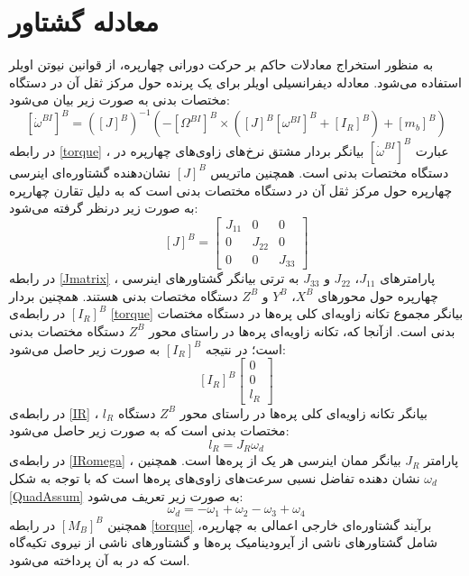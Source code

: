\section{معادله گشتاور}
به منظور استخراج معادلات حاکم بر حرکت دورانی چهارپره، از قوانین نیوتن اویلر استفاده می‌شود. 
معادله دیفرانسیلی اویلر برای یک پرنده حول مرکز ثقل آن در دستگاه مختصات بدنی به صورت زیر بیان می‌شود\cite{zipfel2000modeling}:
\begin{equation}\label{torque}
	\left[\dot\omega^{BI}\right]^B = \left(\left[J\right]^B\right)^{-1}
	\left(-\left[\Omega^{BI}\right]^B\times\left(
	\left[J\right]^B\left[\omega^{BI}\right]^B+
	\left[I_R\right]^B
	\right)+ \left[m_b\right]^B\right)
\end{equation}
در رابطه
\ref{torque}
، عبارت 
$\left[\dot\omega^{BI}\right]^B$
بیانگر بردار مشتق نرخ‌های زاوی‌های چهارپره در دستگاه مختصات بدنی است. همچنین ماتریس 
$\left[J\right]^B$
نشان‌دهنده گشتاوره‌ای اینرسی چهارپره حول مرکز ثقل آن در دستگاه مختصات بدنی است که به دلیل تقارن چهارپره به صورت زیر درنظر گرفته
 می‌شود:
 \begin{equation}\label{Jmatrix}
 	\left[J\right]^B = \begin{bmatrix}
 		J_{11} & 0 &0\\
 		0 & J_{22} & 0\\
 		0 & 0 & J_{33}
 	\end{bmatrix}
 \end{equation}
در رابطه 
\ref{Jmatrix}
، پارامترهای 
$J_{11}$،
$J_{22}$
و 
$J_{33}$
به ترتی بیانگر گشتاور‌های اینرسی چهارپره حول محورهای 
$X^B$،
$Y^B$
و 
$Z^B$
دستگاه مختصات بدنی هستند. همچنین بردار 
$\left[I_R\right]^B$
در رابطه‌ی 
\ref{torque}
بیانگر مجموع تكانه زاویه‌ای کلی پره‌ها در دستگاه مختصات بدنی است. ازآنجا که، تكانه زاویه‌ای پره‌ها در راستای محور
$Z^B$
دستگاه مختصات بدنی است؛ در نتیجه 
$\left[I_R\right]^B$
به صورت زیر حاصل می‌شود:
\begin{equation}\label{IR}
	\left[I_R\right]^B
	\begin{bmatrix}
		0\\0\\l_R
	\end{bmatrix}
\end{equation}
در رابطه‌ی 
\ref{IR}
، 
$l_R$
بیانگر تكانه زاویه‌ای کلی پره‌ها در راستای محور
$Z^B$
دستگاه مختصات بدنی است که به صورت زیر حاصل می‌شود:
\begin{equation}\label{IRomega}
	l_R = J_R\omega_d
\end{equation}
در رابطه‌ی
\ref{IRomega}
، پارامتر
$J_R$
بیانگر ممان اینرسی هر یک از پره‌ها است. همچنین
$\omega_d$
نشان دهنده تفاضل نسبی سرعت‌های زاوی‌های پره‌ها است که با توجه به شكل
\ref{QuadAssum}
به صورت زیر تعریف می‌شود:
\begin{equation}
	\omega_d = -\omega_1 + \omega_2-\omega_3 + \omega_4
\end{equation}
همچنین 
$\left[M_B\right]^B$
در رابطه 
\ref{torque}
برآیند گشتاوره‌ای خارجی اعمالی به چهارپره، شامل 
گشتاورهای ناشی از آیرودینامیک پره‌ها و گشتاورهای ناشی از نیروی تكیه‌گاه است که در به آن پرداخته می‌شود.



